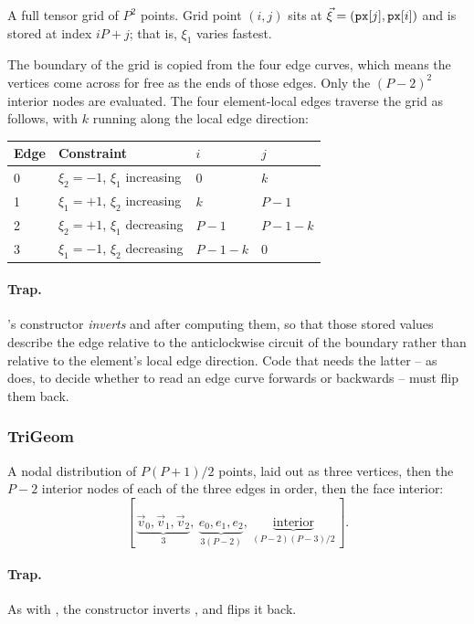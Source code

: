 A full tensor grid of $P^2$ points.  Grid point $(i,j)$ sits at
$\vec{\xi} = (\texttt{px}[j], \texttt{px}[i])$ and is stored at index
$i P + j$; that is, $\xi_1$ varies fastest.

The boundary of the grid is copied from the four edge curves, which means the
vertices come across for free as the ends of those edges.  Only the
$(P-2)^2$ interior nodes are evaluated.  The four element-local edges traverse
the grid as follows, with $k$ running along the local edge direction:

\begin{center}
\begin{tabular}{llll}
\hline
Edge & Constraint & $i$ & $j$ \\
\hline
0 & $\xi_2 = -1$, $\xi_1$ increasing & $0$     & $k$ \\
1 & $\xi_1 = +1$, $\xi_2$ increasing & $k$     & $P-1$ \\
2 & $\xi_2 = +1$, $\xi_1$ decreasing & $P-1$   & $P-1-k$ \\
3 & $\xi_1 = -1$, $\xi_2$ decreasing & $P-1-k$ & $0$ \\
\hline
\end{tabular}
\end{center}

\paragraph{Trap.}  's constructor \emph{inverts}
 and  after computing them, so that
those stored values describe the edge relative to the anticlockwise circuit of
the boundary rather than relative to the element's local edge direction.  Code
that needs the latter -- as  does, to decide whether to
read an edge curve forwards or backwards -- must flip them back.

\subsubsection{TriGeom}

A nodal distribution of $P(P+1)/2$ points, laid out as three vertices, then
the $P-2$ interior nodes of each of the three edges in  order,
then the face interior:
%
$$
[\, \underbrace{\vec{v}_0, \vec{v}_1, \vec{v}_2}_{3},\
     \underbrace{e_0, e_1, e_2}_{3(P-2)},\
     \underbrace{\text{interior}}_{(P-2)(P-3)/2} \,].
$$

\paragraph{Trap.}  As with , the constructor inverts
, and  flips it back.

